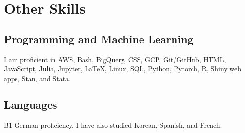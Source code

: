 \documentclass[a4paper]{article}
\begin{document}
\section*{Other Skills}

\subsection*{Programming and Machine Learning}

I am proficient in AWS, Bash, BigQuery, CSS, GCP, Git/GitHub, HTML, JavaScript, Julia, Jupyter, LaTeX, Linux, SQL, Python, Pytorch, R, Shiny web apps, Stan, and Stata.

\subsection*{Languages}

B1 German proficiency. I have also studied Korean, Spanish, and French. 
\end{document}
